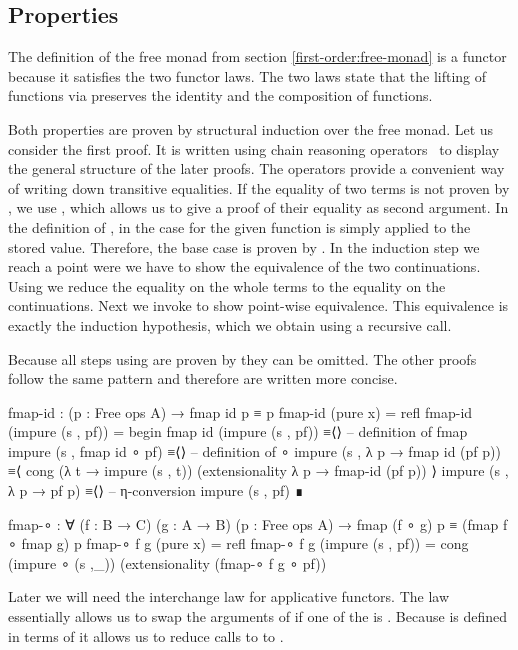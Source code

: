 \subsection{Properties}
\label{first-order:free-monad:properties}

The definition of the free monad from section \ref{first-order:free-monad} is a
functor because it satisfies the two functor laws.
The two laws state that the lifting of functions via 
preserves the identity and the composition of functions.

Both properties are proven by structural induction over the free monad.
Let us consider the first proof.
It is written using chain reasoning operators~\cite{norell:thesis} to display
the general structure of the later proofs.
The operators provide a convenient way of writing down transitive equalities.
If the equality of two terms is not proven by ,
we use , which allows us to give a proof of their
equality as second argument.
In the definition of \AgdaFunction{<\$>}, in the case for
 the given function is simply applied to the
stored value.
Therefore, the base case is proven by .
In the induction step we reach a point were we have to show the equivalence of
the two continuations.
Using  we reduce the equality on the whole terms to the
equality on the continuations.
Next we invoke  to show point-wise equivalence.
This equivalence is exactly the induction hypothesis, which we obtain using a
recursive call.

Because all steps using  are proven by
 they can be omitted.
The other proofs follow the same pattern and therefore are written more concise.

\begin{code}[number=fmap-id]
fmap-id : (p : Free ops A) → fmap id p ≡ p
fmap-id (pure x)           = refl
fmap-id (impure (s , pf))  = begin
  fmap id (impure (s , pf))          ≡⟨⟩ -- definition of fmap
  impure (s , fmap id ∘ pf)          ≡⟨⟩ -- definition of ∘
  impure (s , λ p → fmap id (pf p))  ≡⟨ cong (λ t → impure (s , t))
                                         (extensionality λ p → fmap-id (pf p)) ⟩
  impure (s , λ p → pf p)            ≡⟨⟩ -- η-conversion
  impure (s , pf)                    ∎
\end{code}
\begin{code}[number=fmap-comp]
fmap-∘ : ∀ (f : B → C) (g : A → B) (p : Free ops A) →
  fmap (f ∘ g) p ≡ (fmap f ∘ fmap g) p
fmap-∘ f g (pure x)           = refl
fmap-∘ f g (impure (s , pf))  = cong (impure ∘ (s ,_)) (extensionality (fmap-∘ f g ∘ pf))
\end{code}
Later we will need the interchange law for applicative functors.
The law essentially allows us to swap the arguments of \AgdaFunction{<*>} if one
of the is .
Because \AgdaFunction{<*>} is defined in terms of \AgdaFunction{<\$>} it allows
us to reduce calls to \AgdaFunction{<*>} to \AgdaFunction{<\$>}.

